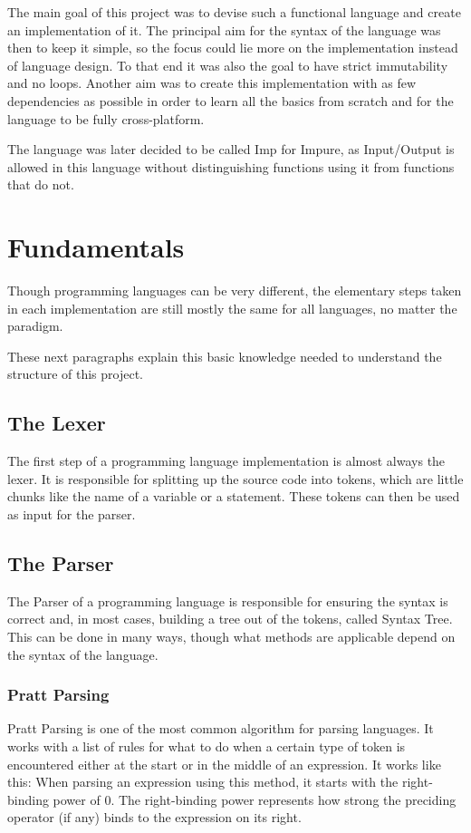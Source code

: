 \documentclass[12pt]{article}
\begin{document}
The main goal of this project was to devise such a functional language
and create an implementation of it.
The principal aim for the syntax of the language was then to keep it simple,
so the focus could lie more on the implementation instead of language design.
To that end it was also the goal to have strict immutability and no loops.
Another aim was to create this implementation with as few dependencies as possible
in order to learn all the basics from scratch and for the language to be fully
cross-platform.

The language was later decided to be called Imp for Impure,
as Input/Output is allowed in this language
without distinguishing functions using it from functions that do not.

\newpage
\section{Fundamentals}
Though programming languages can be very different,
the elementary steps taken in each implementation are
still mostly the same for all languages, no matter the paradigm.

These next paragraphs explain this basic knowledge needed
to understand the structure of this project.

\subsection{The Lexer}
The first step of a programming language implementation is almost always the lexer.
It is responsible for splitting up the source code into tokens,
which are little chunks like the name of a variable or a statement.
These tokens can then be used as input for the parser.

\subsection{The Parser}
The Parser of a programming language is responsible for ensuring the syntax is correct and, in most cases,
building a tree out of the tokens, called Syntax Tree.
This can be done in many ways, though what methods are applicable
depend on the syntax of the language.
\subsubsection{Pratt Parsing}
Pratt Parsing \autocite{prattTopOperatorPrecedence1973}
is one of the most common algorithm for parsing languages.
It works with a list of rules for what to do when a certain type of token is encountered
either at the start or in the middle of an expression.
It works like this:
When parsing an expression using this method,
it starts with the right-binding power of 0.
The right-binding power represents how strong
the preciding operator (if any) binds to the expression
on its right.
\end{document}
